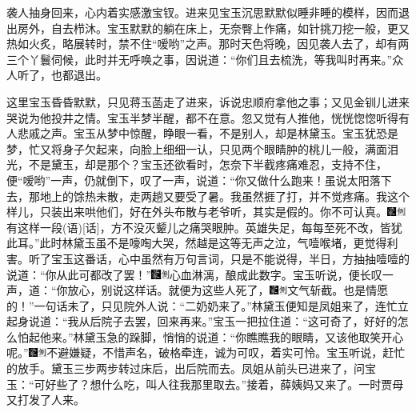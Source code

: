 袭人抽身回来，心内着实感激宝钗。进来见宝玉沉思默默似睡非睡的模样，因而退出房外，自去栉沐。宝玉默默的躺在床上，无奈臀上作痛，如针挑刀挖一般，更又热如火炙，略展转时，禁不住``嗳哟''之声。那时天色将晚，因见袭人去了，却有两三个丫鬟伺候，此时并无呼唤之事，因说道：``你们且去梳洗，等我叫时再来。''众人听了，也都退出。

这里宝玉昏昏默默，只见蒋玉菡走了进来，诉说忠顺府拿他之事；又见金钏儿进来哭说为他投井之情。宝玉半梦半醒，都不在意。忽又觉有人推他，恍恍惚惚听得有人悲戚之声。宝玉从梦中惊醒，睁眼一看，不是别人，却是林黛玉。宝玉犹恐是梦，忙又将身子欠起来，向脸上细细一认，只见两个眼睛肿的桃儿一般，满面泪光，不是黛玉，却是那个？宝玉还欲看时，怎奈下半截疼痛难忍，支持不住，便``嗳哟''一声，仍就倒下，叹了一声，说道：``你又做什么跑来！虽说太阳落下去，那地上的馀热未散，走两趟又要受了暑。我虽然捱了打，并不觉疼痛。我这个样儿，只装出来哄他们，好在外头布散与老爷听，其实是假的。你不可认真。{\includegraphics[width=3mm]{../Images/00006}\includegraphics[width=3mm]{../Images/00011}\footnotesize \kaishu 有这样一段{(语)}{[}话{]}，方不没灭颦儿之痛哭眼肿。英雄失足，每每至死不改，皆犹此耳。}''此时林黛玉虽不是嚎啕大哭，然越是这等无声之泣，气噎喉堵，更觉得利害。听了宝玉这番话，心中虽然有万句言词，只是不能说得，半日，方抽抽噎噎的说道：``你从此可都改了罢！''{\includegraphics[width=3mm]{../Images/00006}\includegraphics[width=3mm]{../Images/00011}\footnotesize \kaishu 心血淋漓，酿成此数字。}宝玉听说，便长叹一声，道：``你放心，别说这样话。就便为这些人死了，{\includegraphics[width=3mm]{../Images/00006}\includegraphics[width=3mm]{../Images/00011}\footnotesize \kaishu 文气斩截。}也是情愿的！''一句话未了，只见院外人说：``二奶奶来了。''林黛玉便知是凤姐来了，连忙立起身说道：``我从后院子去罢，回来再来。''宝玉一把拉住道：``这可奇了，好好的怎么怕起他来。''林黛玉急的跺脚，悄悄的说道：``你瞧瞧我的眼睛，又该他取笑开心呢。''{\includegraphics[width=3mm]{../Images/00006}\includegraphics[width=3mm]{../Images/00011}\footnotesize \kaishu 不避嫌疑，不惜声名，破格牵连，诚为可叹，着实可怜。}宝玉听说，赶忙的放手。黛玉三步两步转过床后，出后院而去。凤姐从前头已进来了，问宝玉：``可好些了？想什么吃，叫人往我那里取去。''接着，薛姨妈又来了。一时贾母又打发了人来。

